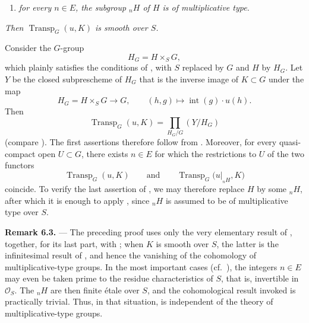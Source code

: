 \begin{enumerate}
\item[\(a'\)] %
\textit{for every \(n\in E\), the subgroup \({}_nH\) of \(H\) is
of multiplicative type.}
\end{enumerate}

\textit{Then \(\operatorname{Transp}_G(u,K)\) is smooth over \(S\).}

Consider the \(G\)-group
\[
  H_G=H\times_SG,
\]
which plainly satisfies the conditions of
, with \(S\) replaced by
\(G\) and \(H\) by \(H_G\).  Let \(Y\) be the closed subprescheme of
\(H_G\) that is the inverse image of \(K\subset G\) under the map
\[
  H_G=H\times_SG\longrightarrow G,\qquad
  (h,g)\longmapsto\operatorname{int}(g)\cdot u(h).
\]
Then
\[
  \operatorname{Transp}_G(u,K)
  =
  \prod_{H_G/G}(Y/H_G)
\]
(compare ).  The first assertions
therefore follow from .
Moreover, for every quasi-compact open \(U\subset G\), there exists
\(n\in E\) for which the restrictions to \(U\) of the two functors
\[
  \operatorname{Transp}_G(u,K)
  \qquad\text{and}\qquad
  \operatorname{Transp}_G\bigl(u|_{{}_nH},K\bigr)
\]
coincide.  To verify the last assertion of
, we may therefore replace
\(H\) by some \({}_nH\), after which it is enough to apply ,
since \({}_nH\) is assumed to be of multiplicative type over \(S\).

\medskip
\noindent{}\textbf{Remark 6.3.} ---
The preceding proof uses only the very elementary result of , together, for its last part, with ; when \(K\) is
smooth over \(S\), the latter is the infinitesimal result of , and hence the vanishing of the cohomology of
multiplicative-type groups.  In the most important cases (cf.\
), the integers \(n\in E\) may
even be taken prime to the residue characteristics of \(S\), that
is, invertible in \(\mathscr O_S\).  The \({}_nH\) are then finite
étale over \(S\), and the cohomological result invoked is practically
trivial.  Thus, in that situation,
 is independent of the theory of
multiplicative-type groups.

